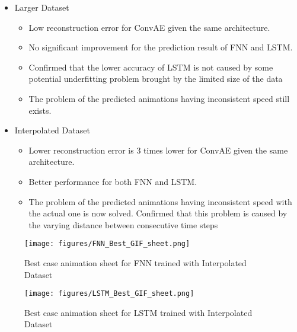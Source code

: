 {\begin{itemize}
\begin{itemize}
        \end{itemize}
        
    \item Larger Dataset
        \begin{itemize}
            \item Low reconstruction error for ConvAE given the same architecture.

            \item No significant improvement for the prediction result of FNN and LSTM.

            \item Confirmed that the lower accuracy of LSTM is not caused by some potential underfitting problem brought by the limited size of the data
            
            \item The problem of the predicted animations having inconsistent speed still exists.
            
        \end{itemize}

        
    \item Interpolated Dataset
    
    \begin{itemize}
            \item Lower reconstruction error is 3 times lower for ConvAE given the same architecture.

            \item Better performance for both FNN and LSTM.
            
            \item The problem of the predicted animations having inconsistent speed with the actual one is now solved. Confirmed that this problem is caused by the varying distance between consecutive time steps
            
    \end{itemize} 
 
        
\end{itemize}

\begin{figure}[H]
    \texttt{[image: figures/FNN\_Best\_GIF\_sheet.png]}
    \caption{Best case animation sheet for FNN trained with Interpolated Dataset}
\end{figure}

\begin{figure}[H]
        \texttt{[image: figures/LSTM\_Best\_GIF\_sheet.png]}
        \caption{Best case animation sheet for LSTM trained with Interpolated Dataset}
\end{figure}

}
